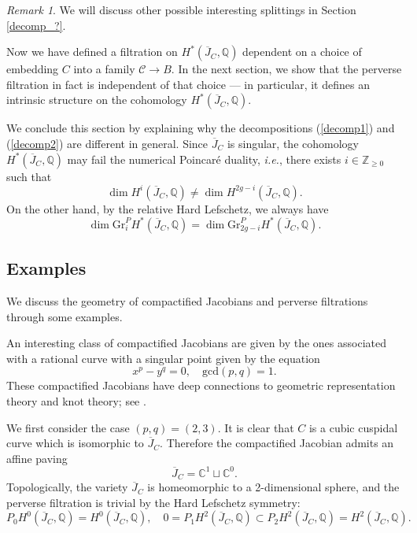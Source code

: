 \documentclass{pspum-l}
\theoremstyle{plain}
\theoremstyle{definition}
\theoremstyle{remark}
\newtheorem{rmk}[thm]{Remark}
\newcommand{\BC}{{\mathbb{C}}}
\newcommand{\BQ}{{\mathbb{Q}}}
\newcommand{\BZ}{{\mathbb{Z}}}
\newcommand{\CC}{{\mathcal C}}
\begin{document}
\begin{rmk}
We will discuss other possible interesting splittings in Section \ref{decomp_?}. 
\end{rmk}

Now we have defined a filtration on $H^*(\overline{J}_C, \BQ)$ dependent on a choice of embedding $C$ into a family $\CC \to B$. In the next section, we show that the perverse filtration in fact is independent of that choice --- in particular, it defines an intrinsic structure on the cohomology $H^*(\overline{J}_C, \BQ)$.


We conclude this section by explaining why the decompositions (\ref{decomp1}) and (\ref{decomp2}) are different in general. Since $\overline{J}_C$ is singular, the cohomology $H^*(\overline{J}_C, \BQ)$ may fail the numerical Poincar\'e duality, \emph{i.e.}, there exists $i\in \BZ_{\geq 0}$ such that 
\[
\dim H^i(\overline{J}_C, \BQ) \neq \dim H^{2g-i}(\overline{J}_C, \BQ).
\]
On the other hand, by the relative Hard Lefschetz, we always have 
\[
\dim \mathrm{Gr}^P_i H^*(\overline{J}_C, \BQ) = \dim \mathrm{Gr}^P_{2g-i} H^*(\overline{J}_C, \BQ).
\]

\subsection{Examples}\label{Examples}
We discuss the geometry of compactified Jacobians and perverse filtrations through some examples.

An interesting class of compactified Jacobians are given by the ones associated with a rational curve with a singular point given by the equation
\begin{equation}\label{p_q}
x^p-y^q=0, \quad \mathrm{gcd}(p,q)=1.
\end{equation}
These compactified Jacobians have deep connections to geometric representation theory and knot theory; see \cite{GORS, GKS, KR, OY,OY2}.


We first consider the case $(p,q)=(2,3)$. It is clear that $C$ is a cubic cuspidal curve which is isomorphic to $\overline{J}_C$. Therefore the compactified Jacobian admits an affine paving
\[
\overline{J}_C = \BC^1 \sqcup \BC^0.
\]
Topologically, the variety $\overline{J}_C$ is homeomorphic to a 2-dimensional sphere, and the perverse filtration is trivial by the Hard Lefschetz symmetry:
\[
P_0H^0(\overline{J}_C, \BQ) = H^0(\overline{J}_C, \BQ), \quad 0 = P_1H^2(\overline{J}_C, \BQ) \subset P_2H^2(\overline{J}_C, \BQ) = H^2(\overline{J}_C, \BQ).
\]
\end{document}
